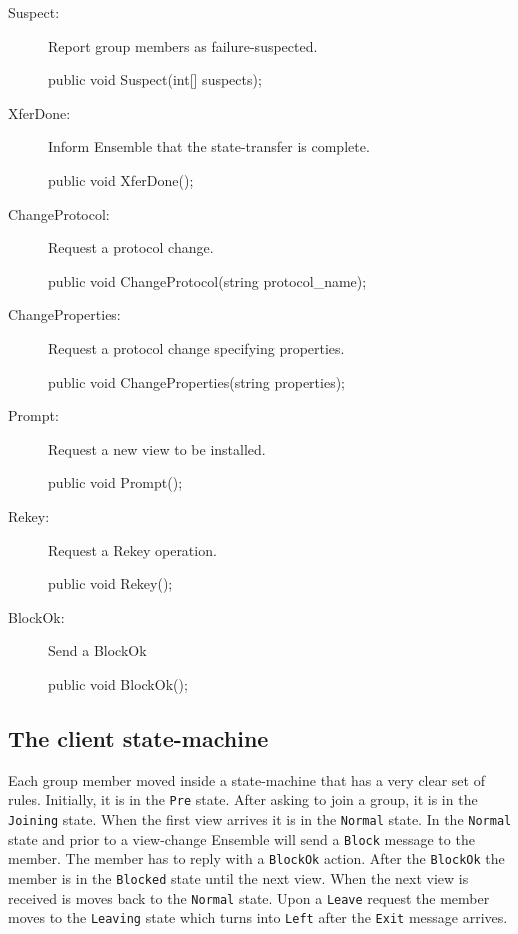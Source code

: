 \begin{description}
\begin{description}
    \item[Suspect:]
      Report group members as failure-suspected.
      \begin{codebox}
	public void Suspect(int[] suspects);
      \end{codebox}
      
    \item[XferDone:]
      Inform Ensemble that the state-transfer is complete. 
      \begin{codebox}
	public void XferDone();
      \end{codebox}
      
    \item[ChangeProtocol:]
      Request a protocol change.
      \begin{codebox}
	public void ChangeProtocol(string protocol\_name);
      \end{codebox}
      
    \item[ChangeProperties:]
      Request a protocol change specifying properties.
      \begin{codebox}
	public void ChangeProperties(string properties);
      \end{codebox}
      
    \item[Prompt:]
      Request a new view to be installed.
      \begin{codebox}
	public void Prompt();
      \end{codebox}
      
    \item[Rekey:]
      Request a Rekey operation.
      \begin{codebox}
	public void Rekey();
      \end{codebox}
      
      \item[BlockOk:]
	Send a BlockOk
	\begin{codebox}
	  public void BlockOk();
	\end{codebox}
  \end{description}
\end{description}


\subsection{The client state-machine}

Each group member moved inside a state-machine that has a very clear set
of rules. Initially, it is in the {\tt Pre} state. After asking to
join a group, it is in the {\tt Joining} state. When the first view
arrives it is in the {\tt Normal} state. In the {\tt Normal} state and
prior to a view-change Ensemble will send a {\tt Block} message to the
member. The member has to reply with a {\tt BlockOk} action. After the {\tt BlockOk} the
member is in the {\tt Blocked} state until the next view. When the
next view is received is moves back to the {\tt Normal} state. Upon a
{\tt Leave} request the member moves to the {\tt Leaving} state which
turns into {\tt Left} after the {\tt Exit} message arrives. 

